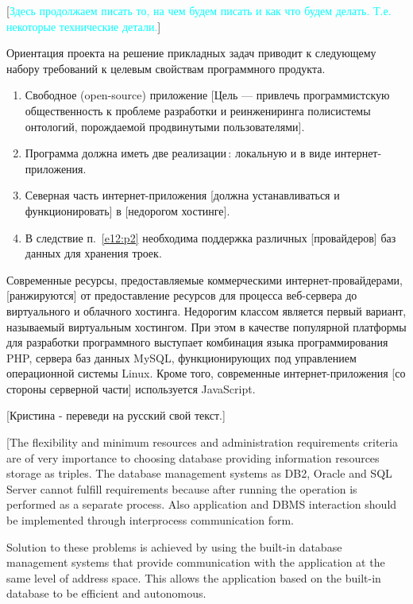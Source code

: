 \documentclass[utf8]{../IncArticle}
\newcommand{\e}[2][fcolor]{\textcolor{pcolor}{[}\textcolor{#1}{#2}\textcolor{pcolor}{]}}
\begin{document}
\e[cyan]{Здесь продолжаем писать то, на чем будем писать и как что
  будем делать. Т.е. некоторые технические детали.}

Ориентация проекта на решение прикладных задач приводит к следующему
набору требований к целевым свойствам программного продукта.
\begin{enumerate}
\item Свободное (open-source) приложение \e{Цель --- привлечь
    программистскую общественность к проблеме разработки и
    реинжениринга полисистемы онтологий, порождаемой продвинутыми пользователями}.
\item Программа должна иметь две реализации\,: локальную и в виде интернет-приложения.
\item Северная часть интернет-приложения \e{должна устанавливаться и
    функционировать} в \e{недорогом хостинге}.  \label{e12:p2}
\item В следствие п.~\ref{e12:p2} необходима поддержка различных
  \e{провайдеров} баз данных для хранения троек.
\end{enumerate}

Современные ресурсы, предоставляемые коммерческими
интернет-провайдерами, \e{ранжируются} от предоставление ресурсов для
процесса веб-сервера до виртуального и облачного хостинга.  Недорогим
классом является первый вариант, называемый виртуальным хостингом.
При этом в качестве популярной платформы для разработки программного
выступает комбинация языка программирования PHP, сервера баз данных
MySQL, функционирующих под управлением операционной системы Linux.
Кроме того, современные интернет-приложения \e{со стороны серверной
  части} используется JavaScript.

\e{Кристина - переведи на русский свой текст.}

[The flexibility and minimum resources and administration requirements criteria are of very importance to choosing database providing information resources storage as triples.  The database management systems as DB2, Oracle and SQL Server cannot fulfill requirements because after running the operation is performed as a separate process.  Also application and DBMS interaction should be implemented through interprocess communication form.

Solution to these problems is achieved by using the built-in database management systems that provide communication with the application at the same level of address space.  This allows the application based on the built-in database to be efficient and autonomous.
\end{document}
